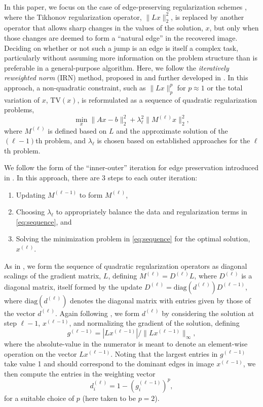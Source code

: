 In this paper, we focus on the case of edge-preserving regularization
schemes \cite{CRVogel_2002a, Gazzola_etal_2020}, where the
Tikhonov regularization operator, $\|Lx\|^2_2$, is replaced by another
operator that allows sharp
changes in the values of the solution, $x$, but only when those
changes are deemed to form a ``natural edge'' in the recovered image.
Deciding on whether or not such a jump is an edge is itself a complex
task, particularly without assuming more information on the problem
structure than is preferable in a general-purpose algorithm.  Here, we
follow the \textit{iteratively reweighted norm} (IRN) method, proposed
in \cite{Gorodnitsky_Rao_1992} and further developed in
\cite{Rodriguez_Wohlberg, RARenaut_etal_2017}. In this approach, a non-quadratic
constraint, such as $\|Lx\|_p^p$ for $p\approx 1$ or the total
variation of $x$, $\mathrm{TV}(x)$, is reformulated as a sequence of
quadratic regularization problems,
\begin{equation}
\label{eq:sequence}
\min_{x} \| A x - b \|_2^2 + \lambda_\ell^2 \| M^{(\ell)} x \|_2^2,
\end{equation}
where $M^{(\ell)}$ is defined based on $L$ and the approximate solution
of the $(\ell-1)$th problem, and $\lambda_\ell$ is chosen based on
established approaches for the $\ell$th problem.

We follow the form of the ``inner-outer'' iteration for
edge preservation introduced in \cite{Gazzola_etal_2020}.  In this
approach, there are 3 steps to each outer iteration:
\begin{enumerate}
\item Updating $M^{(\ell-1)}$ to form $M^{(\ell)}$,
\item Choosing $\lambda_\ell$ to appropriately balance the data and
  regularization terms in \eqref{eq:sequence}, and
\item Solving the minimization problem in \eqref{eq:sequence} for the
  optimal solution, $x^{(\ell)}$.
\end{enumerate}
As in \cite{Gazzola_etal_2020}, we form the sequence of quadratic
regularization operators as diagonal scalings of the gradient matrix,
$L$, defining $M^{(\ell)} = D^{(\ell)}L$, where $D^{(\ell)}$ is a
diagonal matrix, itself formed by the update $D^{(\ell)} =
\text{diag}(d^{(\ell)})D^{(\ell-1)}$, where $\text{diag}(d^{(\ell)})$
denotes the diagonal matrix with entries given by those of the vector
$d^{(\ell)}$.  Again following \cite{Gazzola_etal_2020}, we form
$d^{(\ell)}$ by considering the solution at step $\ell-1$,
$x^{(\ell-1)}$, and normalizing the gradient of the solution, defining
\[
g^{(\ell-1)} = |Lx^{(\ell-1)}| / \|Lx^{(\ell-1)}\|_\infty,
\]
where the absolute-value in the numerator is meant to denote an
element-wise operation on the vector $Lx^{(\ell-1)}$.  Noting that the
largest entries in $g^{(\ell-1)}$ take value 1 and should correspond
to the dominant edges in image $x^{(\ell-1)}$, we then compute the
entries in the weighting vector
\[
d^{(\ell)}_i = 1 - \left(g^{(\ell-1)}_i\right)^p,
\]
for a suitable choice of $p$ (here taken to be $p=2$).

